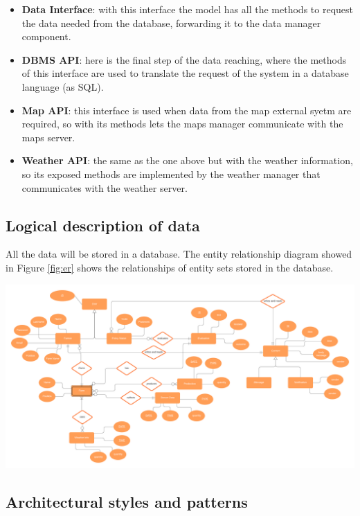 \begin{itemize}
    \item \textbf{Data Interface}: with this interface the model has all the methods to request the data needed from the database, forwarding it to the data manager component. 
    \item \textbf{DBMS API}: here is the final step of the data reaching, where the methods of this interface are used to translate the request of the system in a database language (as SQL).
    \item \textbf{Map API}: this interface is used when data from the map external syetm are required, so with its methods lets the maps manager communicate with the maps server.
    \item \textbf{Weather API}: the same as the one above but with the weather information, so its exposed methods are implemented by the weather manager that communicates with the weather server.
\end{itemize}
\subsection{Logical description of data}
All the data will be stored in a database. 
The entity relationship diagram showed in Figure \ref{fig:er} shows the relationships of entity sets stored in the database.


\begin{adjustbox}{angle=90,center,caption=\emph{ER diagram} view,nofloat=figure}
    \includegraphics[width=1.6\linewidth]{images/ER diagram.png}
    \label{fig:er}
\end{adjustbox}


\subsection{Architectural styles and patterns}


